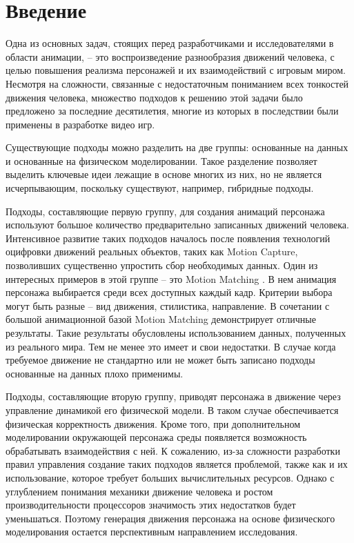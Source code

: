 \section{Введение}

Одна из основных задач, стоящих перед разработчиками и исследователями в области анимации, -- это воспроизведение разнообразия движений человека, с целью повышения реализма персонажей и их взаимодействий с игровым миром. Несмотря на сложности, связанные с недостаточным пониманием всех тонкостей движения человека, множество подходов к решению этой задачи было предложено за последние десятилетия, многие из которых в последствии были применены в разработке видео игр.

Существующие подходы можно разделить на две группы: основанные на данных и основанные на физическом моделировании. Такое разделение позволяет выделить ключевые идеи лежащие в основе многих из них, но не является исчерпывающим, поскольку существуют, например, гибридные подходы.

Подходы, составляющие первую группу, для создания анимаций персонажа используют большое количество предварительно записанных движений человека. Интенсивное развитие таких подходов началось после появления технологий оцифровки движений реальных объектов, таких как Motion Capture, позволивших существенно упростить сбор необходимых данных. Один из интересных примеров в этой группе -- это Motion Matching \cite{MotionMatching}. В нем анимация персонажа выбирается среди всех доступных каждый кадр. Критерии выбора могут быть разные -- вид движения, стилистика, направление. В сочетании с большой анимационной базой Motion Matching демонстрирует отличные результаты. Такие результаты обусловлены использованием данных, полученных из реального мира. Тем не менее это имеет и свои недостатки. В случае когда требуемое движение не стандартно или не может быть записано подходы основанные на данных плохо применимы.

Подходы, составляющие вторую группу, приводят персонажа в движение через управление динамикой его физической модели. В таком случае обеспечивается физическая корректность движения. Кроме того, при дополнительном моделировании окружающей персонажа среды появляется возможность обрабатывать взаимодействия с ней. К сожалению, из-за сложности разработки правил управления создание таких подходов является проблемой, также как и их использование, которое требует больших вычислительных ресурсов. Однако с углублением понимания механики движение человека и ростом производительности процессоров значимость этих недостатков будет уменьшаться. Поэтому генерация движения персонажа на основе физического моделирования остается перспективным направлением исследования.

